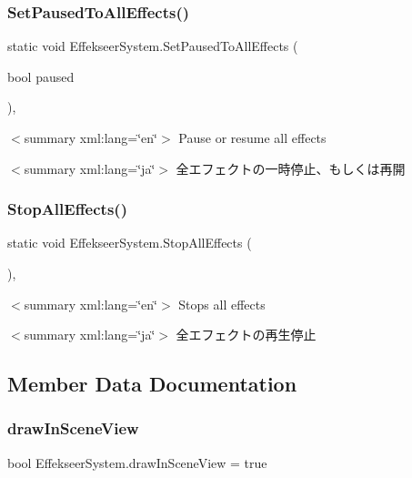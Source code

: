 \subsubsection{\texorpdfstring{Set\+Paused\+To\+All\+Effects()}{SetPausedToAllEffects()}}
{\footnotesize\ttfamily static void Effekseer\+System.\+Set\+Paused\+To\+All\+Effects (\begin{DoxyParamCaption}\item[{bool}]{paused }\end{DoxyParamCaption})\hspace{0.3cm}{\ttfamily [inline]}, {\ttfamily [static]}}

$<$summary xml\+:lang=\char`\"{}en\char`\"{}$>$ Pause or resume all effects 

$<$summary xml\+:lang=\char`\"{}ja\char`\"{}$>$ 全エフェクトの一時停止、もしくは再開 \mbox{\label{class_effekseer_system_acf3dde4a65c0e99aeacfea71b517b541}} 
\subsubsection{\texorpdfstring{Stop\+All\+Effects()}{StopAllEffects()}}
{\footnotesize\ttfamily static void Effekseer\+System.\+Stop\+All\+Effects (\begin{DoxyParamCaption}{ }\end{DoxyParamCaption})\hspace{0.3cm}{\ttfamily [inline]}, {\ttfamily [static]}}

$<$summary xml\+:lang=\char`\"{}en\char`\"{}$>$ Stops all effects 

$<$summary xml\+:lang=\char`\"{}ja\char`\"{}$>$ 全エフェクトの再生停止 

\subsection{Member Data Documentation}
\mbox{\label{class_effekseer_system_a469cf59d9deeaef6e27b15c5fc5ee524}} 
\subsubsection{\texorpdfstring{draw\+In\+Scene\+View}{drawInSceneView}}
{\footnotesize\ttfamily bool Effekseer\+System.\+draw\+In\+Scene\+View = true}

